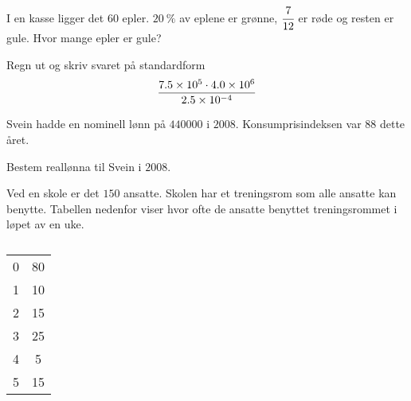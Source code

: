 


\Oppgave[2] %

I en kasse ligger det $60$ epler. $\SI{20}{\percent}$ av eplene er grønne,
$\cfrac{7}{12}$ er røde og resten er gule. Hvor mange epler er gule?


\Oppgave[2] %

Regn ut og skriv svaret på standardform
%
\begin{equation*}
    \frac{\num{7.5E5} \cdot \num{4.0E6}}{\num{2.5E-4}}
\end{equation*}


\Oppgave[2] %

Svein hadde en nominell lønn på $\num{440 000}$ i $2008$. Konsumprisindeksen var
$88$ dette året.
\bigskip\noindent

Bestem reallønna til Svein i $2008$.


\Oppgave[3] %

Ved en skole er det $150$ ansatte. Skolen har et treningsrom som alle ansatte
kan benytte. Tabellen nedenfor viser hvor ofte de ansatte benyttet
treningsrommet i løpet av en uke.

\begin{table}[H]
    \centering
    \caption{}
    \begin{tabular}{| S[table-format=2.0] | S[table-format=2.0] |}
         0 & 80 \\
         1 & 10 \\
         2 & 15 \\
         3 & 25 \\
         4 &  5 \\
         5 & 15 \\ \hline
    \end{tabular}
    \label{tab:del-1-oppgave-1.4}
\end{table}

\Oppgave[2] %

\begin{figure}[H]
    \centering
    \caption{}
    \label{fig:del-1-oppgave-1-5}
\end{figure}

